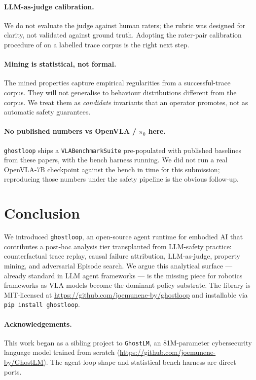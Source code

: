 \documentclass[11pt]{article}
\begin{document}
\paragraph{LLM-as-judge calibration.} We do not evaluate the
judge against human raters; the rubric was designed for clarity,
not validated against ground truth. Adopting the rater-pair
calibration procedure of \citet{zheng2023judging} on a labelled
trace corpus is the right next step.

\paragraph{Mining is statistical, not formal.} The mined
properties capture empirical regularities from a successful-trace
corpus. They will not generalise to behaviour distributions
different from the corpus. We treat them as \emph{candidate}
invariants that an operator promotes, not as automatic safety
guarantees.

\paragraph{No published numbers vs OpenVLA / $\pi_0$ here.}
\texttt{ghostloop} ships a \texttt{VLABenchmarkSuite} pre-populated
with published baselines from these papers, with the bench
harness running. We did not run a real OpenVLA-7B checkpoint
against the bench in time for this submission; reproducing those
numbers under the safety pipeline is the obvious follow-up.

\section{Conclusion}

We introduced \texttt{ghostloop}, an open-source agent runtime
for embodied AI that contributes a post-hoc analysis tier
transplanted from LLM-safety practice: counterfactual trace
replay, causal failure attribution, LLM-as-judge, property
mining, and adversarial Episode search. We argue this analytical
surface — already standard in LLM agent frameworks — is the
missing piece for robotics frameworks as VLA models become the
dominant policy substrate. The library is MIT-licensed at
\url{https://github.com/joemunene-by/ghostloop} and installable
via \texttt{pip install ghostloop}.

\paragraph{Acknowledgements.} This work began as a sibling
project to \texttt{GhostLM}, an 81M-parameter cybersecurity
language model trained from scratch
(\url{https://github.com/joemunene-by/GhostLM}). The agent-loop
shape and statistical bench harness are direct ports.



\end{document}
